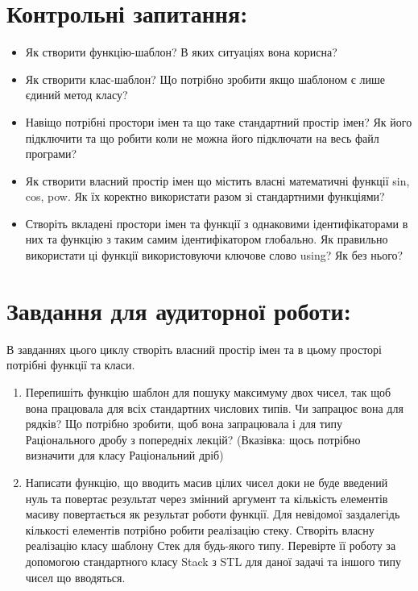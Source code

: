 \documentclass[a5paper,titlepage,openany,twoside,
]
{book_unv}%
\begin{document}
\section{Контрольні запитання:}
\begin{itemize}
\item
Як створити функцію-шаблон? В яких ситуаціях вона корисна?
\item
Як створити клас-шаблон? Що потрібно зробити якщо шаблоном є лише
єдиний метод класу?
\item
  Навіщо потрібні простори імен та що таке стандартний простір імен? Як
  його підключити та що робити коли не можна його підключати на весь
  файл програми?
\item
  Як створити власний простір імен що містить власні математичні функції
  sin, cos, pow. Як їх коректно використати разом зі стандартними
  функціями?
\item
  Створіть вкладені простори імен та функції з однаковими
  ідентифікаторами в них та функцію з таким самим ідентифікатором
  глобально. Як правильно використати ці функції використовуючи ключове
  слово using? Як без нього?
\end{itemize}

\section{Завдання для аудиторної роботи:}
В завданнях цього циклу створіть власний простір імен та в цьому просторі
потрібні функції та класи.  

\begin{enumerate}
\def\labelenumi{\arabic{enumi})}

\item
  Перепишіть функцію шаблон для пошуку максимуму двох чисел,
  так щоб вона працювала для всіх стандартних числових типів.
Чи запрацює вона для рядків?
Що потрібно зробити, щоб вона запрацювала і для типу
Раціонального дробу з попередніх лекцій?
(Вказівка: щось потрібно визначити для класу Раціональний дріб)

\item
 Написати функцію, що вводить масив цілих чисел доки не буде введений нуль
та повертає результат через змінний аргумент та
кількість елементів масиву повертається як результат роботи функції.
Для невідомої заздалегідь кількості елементів потрібно робити реалізацію стеку.
Створіть власну реалізацію класу шаблону Стек для будь-якого типу. Перевірте її роботу за
допомогою стандартного класу Stack з STL для даної задачі та іншого типу чисел що вводяться.


\end{enumerate}
\end{document}
